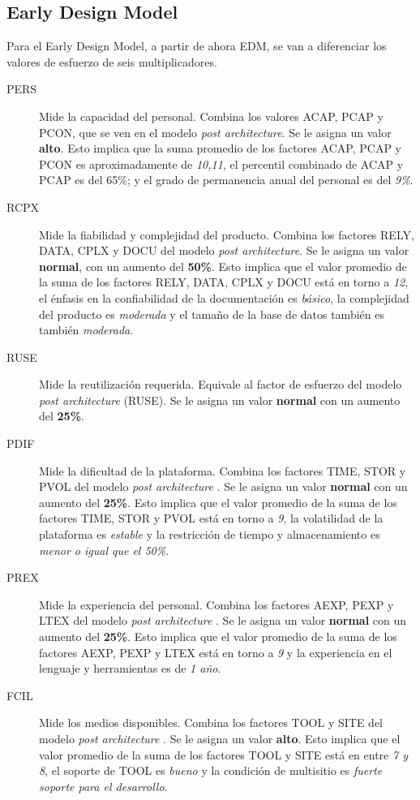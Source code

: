 \documentclass[11pt,a4paper,spanish,twoside]{report}
\begin{document}
\subsection{Early Design Model}
Para el Early Design Model, a partir de ahora EDM, se van a diferenciar los
valores de esfuerzo de seis multiplicadores.

\begin{description}
\item[PERS] Mide la capacidad del personal. Combina los valores ACAP, PCAP y
PCON, que se ven en el modelo \emph{post architecture}. Se le asigna un
valor \textbf{alto}. Esto implica que la suma promedio de los factores
ACAP, PCAP y PCON es aproximadamente de \emph{10,11}, el percentil combinado
de ACAP y PCAP es del 65\%; y el grado de permanencia anual del personal es
del \emph{9\%}.

\item[RCPX] Mide la fiabilidad y complejidad del producto. Combina los
factores RELY, DATA, CPLX y DOCU del modelo \emph{post architecture}. Se le
asigna un valor \textbf{normal}, con un aumento del \textbf{50\%}. Esto
implica que el valor promedio de la suma de los factores RELY, DATA, CPLX y
DOCU está en torno a \emph{12}, el énfasis en la confiabilidad de la
documentación es \emph{básico}, la complejidad del producto es
\emph{moderada} y el tamaño de la base de datos también es también
\emph{moderada}.

\item[RUSE] Mide la reutilización requerida. Equivale al factor de esfuerzo
del modelo \emph{post architecture} (RUSE). Se le asigna un valor
\textbf{normal} con un aumento del \textbf{25\%}.

\item[PDIF] Mide la dificultad de la plataforma. Combina los factores TIME, 
STOR y PVOL del modelo \emph{post architecture} . Se le asigna un valor
\textbf{normal} con un aumento del \textbf{25\%}. Esto implica que el valor 
promedio de la suma de los factores TIME, STOR y PVOL está en torno a \emph{9},
la volatilidad de la plataforma es \emph{estable} y la restricción de tiempo y
almacenamiento es \emph{menor o igual que el 50\%}.

\item[PREX] Mide la experiencia del personal. Combina los factores AEXP, PEXP y
LTEX del modelo \emph{post architecture} . Se le asigna un valor 
\textbf{normal} con un aumento del \textbf{25\%}. Esto implica que el valor 
promedio de la suma de los factores AEXP, PEXP y LTEX está en torno a \emph{9}
y la experiencia en el lenguaje y herramientas es de \emph{1 año}.

\item[FCIL] Mide los medios disponibles. Combina los factores TOOL y SITE del 
modelo \emph{post architecture} . Se le asigna un valor \textbf{alto}. Esto 
implica que el valor promedio de la suma de los factores TOOL y SITE está en 
entre \emph{7 y 8}, el soporte de TOOL es \emph{bueno} y la condición de 
multisitio es \emph{fuerte soporte para el desarrollo}.

\end{description}
\end{document}
